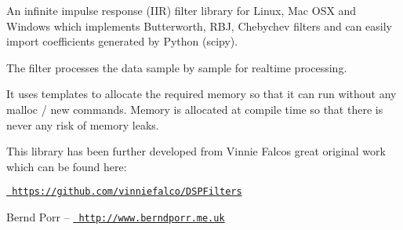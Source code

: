 An infinite impulse response (I\+IR) filter library for Linux, Mac O\+SX and Windows which implements Butterworth, R\+BJ, Chebychev filters and can easily import coefficients generated by Python (scipy).

The filter processes the data sample by sample for realtime processing.

It uses templates to allocate the required memory so that it can run without any malloc / new commands. Memory is allocated at compile time so that there is never any risk of memory leaks.

This library has been further developed from Vinnie Falco\textquotesingle{}s great original work which can be found here\+:

\href{https://github.com/vinniefalco/DSPFilters}{\texttt{ https\+://github.\+com/vinniefalco/\+D\+S\+P\+Filters}}

Bernd Porr -- \href{http://www.berndporr.me.uk}{\texttt{ http\+://www.\+berndporr.\+me.\+uk}} 